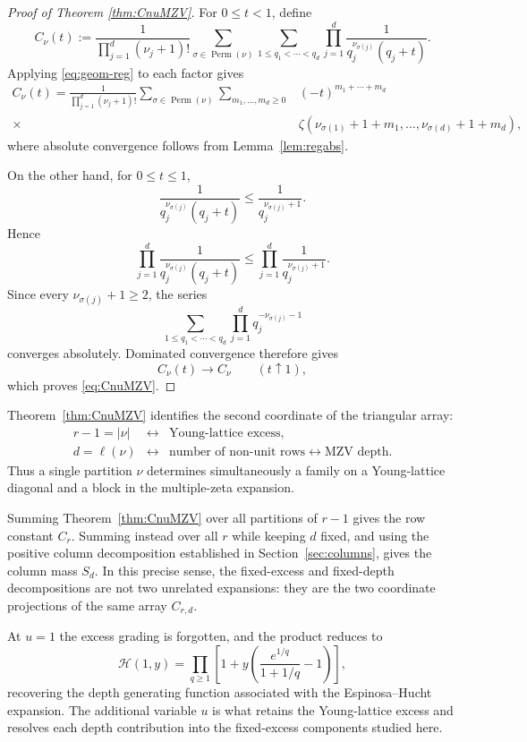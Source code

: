 \documentclass[11pt]{article}
\theoremstyle{definition}
\begin{document}
\begin{proof}[Proof of Theorem \ref{thm:CnuMZV}]
For $0\leq t<1$, define
\[
 C_\nu(t)
 :=
 \frac{1}
 {\prod_{j=1}^d(\nu_j+1)!}
 \sum_{\sigma\in\operatorname{Perm}(\nu)}
 \sum_{1\leq q_1<\cdots<q_d}
 \prod_{j=1}^d
 \frac{1}
 {q_j^{\nu_{\sigma(j)}}(q_j+t)}.
\]
Applying \eqref{eq:geom-reg} to each factor gives
\begin{align*}
 C_\nu(t)
 =
 \frac{1}
 {\prod_{j=1}^d(\nu_j+1)!}
 \sum_{\sigma\in\operatorname{Perm}(\nu)}
 \sum_{m_1,\ldots,m_d\geq0}
 &
 (-t)^{m_1+\cdots+m_d}\\
 {}\times&
 \zeta\!\left(
 \nu_{\sigma(1)}+1+m_1,\ldots,
 \nu_{\sigma(d)}+1+m_d
 \right),
\end{align*}
where absolute convergence follows from
Lemma~\ref{lem:regabs}.

On the other hand, for $0\leq t\leq1$,
\[
 \frac{1}
 {q_j^{\nu_{\sigma(j)}}(q_j+t)}
 \leq
 \frac{1}
 {q_j^{\nu_{\sigma(j)}+1}}.
\]
Hence
\[
 \prod_{j=1}^d
 \frac{1}
 {q_j^{\nu_{\sigma(j)}}(q_j+t)}
 \leq
 \prod_{j=1}^d
 \frac{1}
 {q_j^{\nu_{\sigma(j)}+1}}.
\]
Since every $\nu_{\sigma(j)}+1\geq2$, the series
\[
 \sum_{1\leq q_1<\cdots<q_d}
 \prod_{j=1}^d
 q_j^{-\nu_{\sigma(j)}-1}
\]
converges absolutely.  Dominated convergence therefore gives
\[
        C_\nu(t)\longrightarrow C_\nu
        \qquad (t\uparrow1),
\]
which proves \eqref{eq:CnuMZV}.
\end{proof}


Theorem~\ref{thm:CnuMZV} identifies the second coordinate of
the triangular array:
\[
 \boxed{
 \begin{array}{rcl}
 r-1=|\nu|
 &\longleftrightarrow&
 \text{Young-lattice excess},\\[1mm]
 d=\ell(\nu)
 &\longleftrightarrow&
 \text{number of non-unit rows}
 \longleftrightarrow
 \text{MZV depth}.
 \end{array}}
\]
Thus a single partition $\nu$ determines simultaneously a family on
a Young-lattice diagonal and a block in the multiple-zeta expansion.

Summing Theorem~\ref{thm:CnuMZV} over all partitions of $r-1$ gives
the row constant $C_r$.  Summing instead over all $r$ while keeping $d$ fixed,
and using the positive column decomposition established in Section~\ref{sec:columns},
gives the column mass $S_d$.  In this precise sense, the fixed-excess
and fixed-depth decompositions are not two unrelated expansions:
they are the two coordinate projections of the same array
$C_{r,d}$.

At $u=1$ the excess grading is forgotten, and the product reduces to
\[
        \mathscr H(1,y)
        =
        \prod_{q\geq1}
        \left[
        1+y\left(
        \frac{e^{1/q}}{1+1/q}-1
        \right)
        \right],
\]
recovering the depth generating function associated with the
Espinosa--Hucht expansion.  The additional variable $u$ is what
retains the Young-lattice excess and resolves each depth contribution
into the fixed-excess components studied here.
\end{document}
